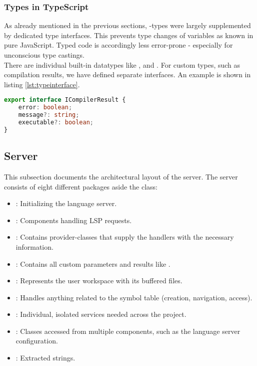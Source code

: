 \subsubsection{Types in TypeScript}
As already mentioned in the previous sections, -types were largely supplemented by dedicated type interfaces.
This prevents type changes of variables as known in pure JavaScript.
Typed code is accordingly less error-prone - especially for unconscious type castings. \\

There are individual built-in datatypes like ,  and  \cite{ts-types}.
For custom types, such as compilation results, we have defined separate interfaces.
An example is shown in listing \ref{lst:typeinterface}.

\begin{lstlisting}[language=typescript, caption={Type Interface Supplementing \code{any}-types}, captionpos=b, label={lst:typeinterface}]
export interface ICompilerResult {
    error: boolean;
    message?: string;
    executable?: boolean;
}
\end{lstlisting}




\subsection{Server}
This subsection documents the architectural layout of the server.
The server consists of eight different packages aside the  class:
\begin{itemize}
    \item {}: Initializing the language server.
    \item {}: Components handling LSP requests.
    \item {}: Contains provider-classes that supply the handlers with the necessary information.
    \item {}: Contains all custom parameters and results like .
    \item {}: Represents the user workspace with its buffered files.
    \item {}: Handles anything related to the symbol table (creation, navigation, access).
    \item {}: Individual, isolated services needed across the project.
    \item {}: Classes accessed from multiple components, such as the language server configuration.
    \item {}: Extracted strings.
\end{itemize}

